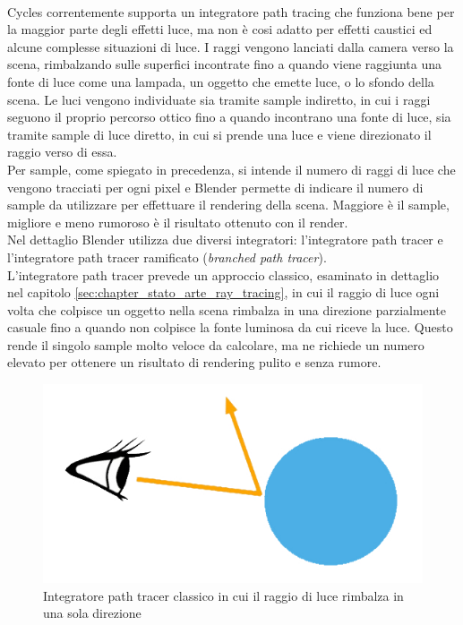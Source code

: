 \\
Cycles correntemente supporta un integratore path tracing che funziona bene per la maggior parte degli effetti luce, ma non è cosi adatto per effetti caustici ed alcune complesse situazioni di luce. I raggi vengono lanciati dalla camera verso la scena, rimbalzando sulle superfici incontrate fino a quando viene raggiunta una fonte di luce come una lampada, un oggetto che emette luce, o lo sfondo della scena. 
Le luci vengono individuate sia tramite sample indiretto, in cui i raggi seguono il proprio percorso ottico fino a quando incontrano una fonte di luce, sia tramite sample di luce diretto, in cui si prende una luce e viene direzionato il raggio verso di essa.
\\
Per sample, come spiegato in precedenza, si intende il numero di raggi di luce che vengono tracciati per ogni pixel e Blender permette di indicare il numero di sample da utilizzare per effettuare il rendering della scena. Maggiore è il sample, migliore e meno rumoroso è il risultato ottenuto con il render.
\\
Nel dettaglio Blender utilizza due diversi integratori: l’integratore path tracer e l’integratore path tracer ramificato (\emph{branched path tracer}).
\\
L’integratore path tracer prevede un approccio classico, esaminato in dettaglio nel capitolo \ref{sec:chapter_stato_arte_ray_tracing}, in cui il raggio di luce ogni volta che colpisce un oggetto nella scena rimbalza in una direzione parzialmente casuale fino a quando non colpisce la fonte luminosa da cui riceve la luce.
Questo rende il singolo sample molto veloce da calcolare, ma ne richiede un numero elevato per ottenere un risultato di rendering pulito e senza rumore.
\begin{figure}[htb]
 \centering
 \includegraphics[width=0.6\linewidth]{images/chapter_tecnologie_abilitanti/tecnologie_abilitanti_sferaluce1.jpg}\hfill
 \caption[Integratore path tracer classico]{Integratore path tracer classico in cui il raggio di luce rimbalza in una sola direzione}
 \label{fig:tecnologie_abilitanti_sferaluce1}
\end{figure}
